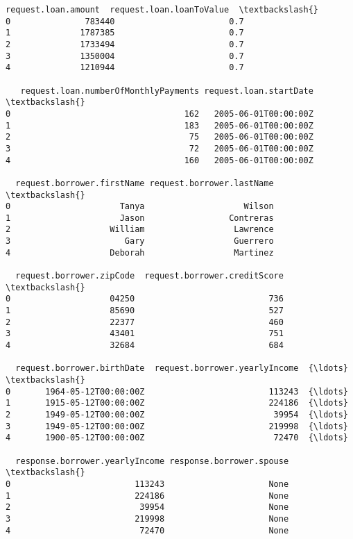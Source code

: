 \documentclass[11pt]{article}
\makeatletter
\newcommand{\boxspacing}{\kern\kvtcb@left@rule\kern\kvtcb@boxsep}
\newcommand{\prompt}[4]{
        {\ttfamily\llap{{\color{#2}[#3]:\hspace{3pt}#4}}\vspace{-\baselineskip}}
    }
\makeatother
\begin{document}
            \begin{tcolorbox}[breakable, size=fbox, boxrule=.5pt, pad at break*=1mm, opacityfill=0]
\prompt{Out}{outcolor}{2}{\boxspacing}
\begin{Verbatim}[commandchars=\\\{\}]
   request.loan.amount  request.loan.loanToValue  \textbackslash{}
0               783440                       0.7
1              1787385                       0.7
2              1733494                       0.7
3              1350004                       0.7
4              1210944                       0.7

   request.loan.numberOfMonthlyPayments request.loan.startDate  \textbackslash{}
0                                   162   2005-06-01T00:00:00Z
1                                   183   2005-06-01T00:00:00Z
2                                    75   2005-06-01T00:00:00Z
3                                    72   2005-06-01T00:00:00Z
4                                   160   2005-06-01T00:00:00Z

  request.borrower.firstName request.borrower.lastName  \textbackslash{}
0                      Tanya                    Wilson
1                      Jason                 Contreras
2                    William                  Lawrence
3                       Gary                  Guerrero
4                    Deborah                  Martinez

  request.borrower.zipCode  request.borrower.creditScore  \textbackslash{}
0                    04250                           736
1                    85690                           527
2                    22377                           460
3                    43401                           751
4                    32684                           684

  request.borrower.birthDate  request.borrower.yearlyIncome  {\ldots}  \textbackslash{}
0       1964-05-12T00:00:00Z                         113243  {\ldots}
1       1915-05-12T00:00:00Z                         224186  {\ldots}
2       1949-05-12T00:00:00Z                          39954  {\ldots}
3       1949-05-12T00:00:00Z                         219998  {\ldots}
4       1900-05-12T00:00:00Z                          72470  {\ldots}

  response.borrower.yearlyIncome response.borrower.spouse  \textbackslash{}
0                         113243                     None
1                         224186                     None
2                          39954                     None
3                         219998                     None
4                          72470                     None


\end{Verbatim}
\end{tcolorbox}
\end{document}
